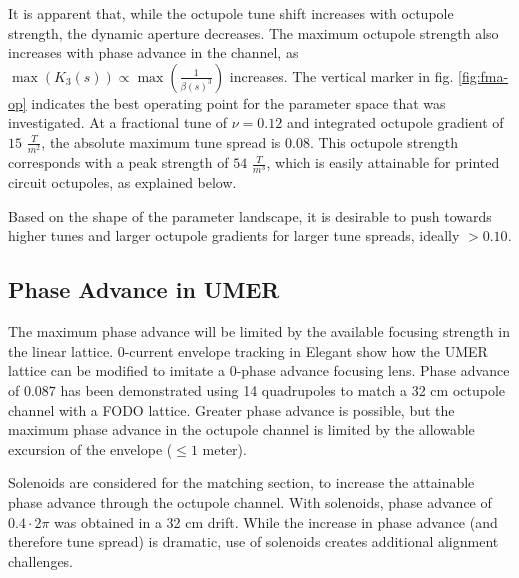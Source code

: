 It is apparent that, while the octupole tune shift increases with octupole strength, the dynamic aperture decreases. 
The maximum octupole strength also increases with phase advance in the channel, as $\max{\left( K_3(s)\right)} \propto \max{\left(\frac{1}{\beta(s)^3}\right)}$ increases. 
The vertical marker in fig. \ref{fig:fma-op} indicates the best operating point for the parameter space that was investigated. 
At a fractional tune of $\nu = 0.12$ and integrated octupole gradient of $15$  $\frac{T}{m^2}$, the absolute maximum tune spread is $0.08$. 
This octupole strength corresponds with a peak strength of $54$  $\frac{T}{m^3}$, which is easily attainable for printed circuit octupoles, as explained below.

Based on the shape of the parameter landscape, it is desirable to push towards higher tunes and larger octupole gradients for larger tune spreads, ideally $> 0.10$.


\subsection{Phase Advance in UMER}

The maximum phase advance will be limited by the available focusing strength in the linear lattice.
0-current envelope tracking in Elegant show how the UMER lattice can be modified to imitate a 0-phase advance focusing lens.\cite{RuisardAAC2014} 
Phase advance of $0.087$ has been demonstrated using 14 quadrupoles to match a 32 cm octupole channel with a FODO lattice. Greater phase advance is possible, but 
the maximum phase advance in the octupole channel is limited by the allowable excursion of the envelope ($\leq1$ meter).

Solenoids are considered for the matching section, to increase the attainable phase advance through the octupole channel. 
With solenoids, phase advance of $0.4\cdot2 \pi$ was obtained in a 32 cm drift. 
While the increase in phase advance (and therefore tune spread) is dramatic, use of solenoids creates additional alignment challenges. 



























